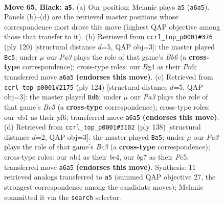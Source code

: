 \documentclass[11pt]{article}
\begin{document}
\clearpage

\begin{figure}[p]\centering
\begin{subfigure}{0.46\textwidth}\centering
\resizebox{\linewidth}{!}{%
\newchessgame
\chessboard[
  setfen={8/6B1/p7/2k5/2p3b1/8/5K2/1N6 b - - 29 65},
  showmover=false,
  pgfstyle=straightmove, color=movearrow, markmove={a6-a5}
]}
\caption{}
\end{subfigure}\hfill
\begin{subfigure}{0.46\textwidth}\centering
\resizebox{\linewidth}{!}{%
\newchessgame
\chessboard[
  setfen={2k5/4Pb2/PB1K4/8/8/8/8/8 w - - 11 61},
  showmover=false,
  pgfstyle=straightmove, color=movearrow, markmove={b6-c5}
]}
\caption{}
\end{subfigure}
\\[4pt]
\begin{subfigure}{0.46\textwidth}\centering
\resizebox{\linewidth}{!}{%
\newchessgame
\chessboard[
  setfen={8/8/5p2/2B4k/4P3/5K2/8/2b5 w - - 0 63},
  showmover=false,
  pgfstyle=straightmove, color=movearrow, markmove={c5-d6}
]}
\caption{}
\end{subfigure}\hfill
\begin{subfigure}{0.46\textwidth}\centering
\resizebox{\linewidth}{!}{%
\newchessgame
\chessboard[
  setfen={2k5/8/8/1PP5/K3b3/2B5/8/8 w - - 15 70},
  showmover=false,
  pgfstyle=straightmove, color=movearrow, markmove={c3-a5}
]}
\caption{}
\end{subfigure}
\caption{\textbf{Move 65, Black: \texttt{a5}.} (a) Our position; Melanie plays \texttt{a5} (\texttt{a6a5}). Panels (b)--(d) are the retrieved master positions whose correspondence most drove this move (highest QAP objective among those that transfer to it). (b) Retrieved from \texttt{ccrl\_top\_p0001\#376} (ply 120) [structural distance $d$=5, QAP obj=3]: the master played \texttt{Bc5}; under $\mu$ our \emph{Pa3} plays the role of that game's \emph{Bb6} (a \textbf{cross-type} correspondence); cross-type roles: our \emph{B}g4 as their \emph{P}a6; transferred move \texttt{a6a5} \textbf{(endorses this move)}. (c) Retrieved from \texttt{ccrl\_top\_p0001\#2175} (ply 124) [structural distance $d$=5, QAP obj=3]: the master played \texttt{Bd6}; under $\mu$ our \emph{Pa3} plays the role of that game's \emph{Bc5} (a \textbf{cross-type} correspondence); cross-type roles: our \emph{n}b1 as their \emph{p}f6; transferred move \texttt{a6a5} \textbf{(endorses this move)}. (d) Retrieved from \texttt{ccrl\_top\_p0001\#3102} (ply 138) [structural distance $d$=2, QAP obj=3]: the master played \texttt{Ba5}; under $\mu$ our \emph{Pa3} plays the role of that game's \emph{Bc3} (a \textbf{cross-type} correspondence); cross-type roles: our \emph{n}b1 as their \emph{b}e4, our \emph{b}g7 as their \emph{P}c5; transferred move \texttt{a6a5} \textbf{(endorses this move)}. Synthesis: 11 retrieved analogs transferred to \texttt{a5} (summed QAP objective 27, the strongest correspondence among the candidate moves); Melanie committed it via the \texttt{search} selector.}
\label{fig:thought-m129}
\end{figure}
\end{document}
